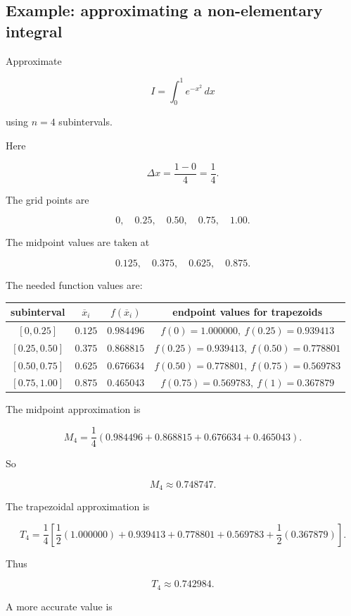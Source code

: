 \subsection{Example: approximating a non-elementary integral}
\label{subsec:example-approx-e-minus-x-squared}

Approximate

\[
I=\int_0^1 e^{-x^2}\,dx
\]

using \(n=4\) subintervals.

Here

\[
\Delta x=\frac{1-0}{4}=\frac14.
\]

The grid points are

\[
0,\quad 0.25,\quad 0.50,\quad 0.75,\quad 1.00.
\]

The midpoint values are taken at

\[
0.125,\quad 0.375,\quad 0.625,\quad 0.875.
\]

The needed function values are:

\begin{center}
\begin{tabular}{c|c|c|c}
\textbf{subinterval} & \(\overline{x}_i\) & \(f(\overline{x}_i)\) & \textbf{endpoint values for trapezoids} \\ \hline
\([0,0.25]\) & \(0.125\) & \(0.984496\) & \(f(0)=1.000000,\ f(0.25)=0.939413\) \\
\([0.25,0.50]\) & \(0.375\) & \(0.868815\) & \(f(0.25)=0.939413,\ f(0.50)=0.778801\) \\
\([0.50,0.75]\) & \(0.625\) & \(0.676634\) & \(f(0.50)=0.778801,\ f(0.75)=0.569783\) \\
\([0.75,1.00]\) & \(0.875\) & \(0.465043\) & \(f(0.75)=0.569783,\ f(1)=0.367879\)
\end{tabular}
\end{center}

The midpoint approximation is

\[
M_4
=
\frac14
\left(
0.984496+0.868815+0.676634+0.465043
\right).
\]

So

\[
\boxed{
M_4\approx 0.748747.
}
\]

The trapezoidal approximation is

\[
T_4
=
\frac14
\left[
\frac12(1.000000)
+0.939413+0.778801+0.569783
+\frac12(0.367879)
\right].
\]

Thus

\[
\boxed{
T_4\approx 0.742984.
}
\]

A more accurate value is

